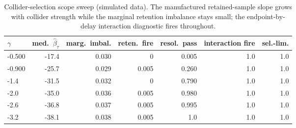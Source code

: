 ﻿%
\begin{table}[t]
\centering
\caption{Collider-selection scope sweep (simulated data). The manufactured retained-sample slope grows with collider strength while the marginal retention imbalance stays small; the endpoint-by-delay interaction diagnostic fires throughout.}
\label{tab:si-collider-sweep}
\footnotesize
\begin{tabular}{lrrrrrr}
\toprule
$\gamma$ & med.\ $\widehat{\beta}_\tau$ & marg.\ imbal. & reten.\ fire & resol.\ pass & interaction fire & sel.-lim. \\
\midrule
-0.500 & -17.4 & 0.030 & 0 & 0.005 & 1.0 & 1.0 \\
-0.900 & -25.7 & 0.029 & 0.005 & 0.260 & 1.0 & 1.0 \\
-1.4 & -31.5 & 0.032 & 0 & 0.790 & 1.0 & 1.0 \\
-2.0 & -35.0 & 0.036 & 0.005 & 0.980 & 1.0 & 1.0 \\
-2.6 & -36.8 & 0.037 & 0.005 & 0.995 & 1.0 & 1.0 \\
-3.2 & -38.1 & 0.038 & 0.005 & 1.0 & 1.0 & 1.0 \\
\bottomrule
\end{tabular}
\end{table}


